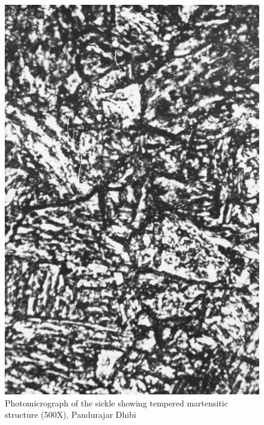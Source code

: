 \begin{figure}[H]
\renewcommand{\thefigure}{22A}
\includegraphics[scale=0.75]{images/chapter-4/fig022A.jpg}
\caption{Photomicrograph of the sickle showing tempered martensitic structure (500X), Pandurajar Dhibi}\label{chapter-4-fig22A}
\end{figure}

\newpage

